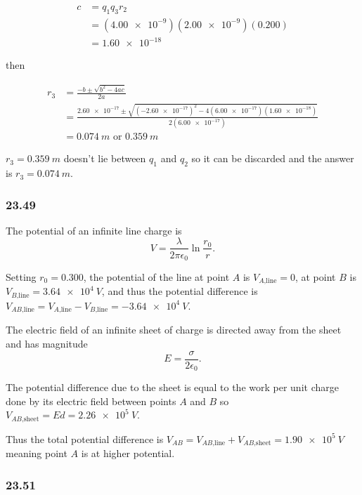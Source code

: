 \documentclass{article}
\begin{document}
\begin{enumerate}[a)]
        \begin{align*}
          c & = q_1 q_3 r_2                             \\
            & = (\num{4.00e-9}) (\num{2.00e-9}) (0.200) \\
            & = \num{1.60e-18}
        \end{align*}

        then

        \begin{align*}
          r_3 & = \frac{-b \pm \sqrt{b^2 - 4 a c}}{2 a}                                                                          \\
              & = \frac{\num{2.60e-17} \pm \sqrt{(\num{-2.60e-17})^2 - 4 (\num{6.00e-17}) (\num{1.60e-18})}}{2 (\num{6.00e-17})} \\
              & = \qty{0.074}{m} \textrm{ or } \qty{0.359}{m}
        \end{align*}

        $r_3 = \qty{0.359}{m}$ doesn't lie between $q_1$ and $q_2$ so it can be discarded and the answer is $r_3 = \qty{0.074}{m}$.
\end{enumerate}

\subsubsection{23.49}

The potential of an infinite line charge is \[V = \frac{\lambda}{2 \pi \epsilon_0} \ln \frac{r_0}{r}.\]

Setting $r_0 = 0.300$, the potential of the line at point $A$ is $V_{A\textrm{,line}} = 0$, at point $B$ is $V_{B\textrm{,line}} = \qty{3.64e4}{V}$, and thus the potential difference is $V_{AB\textrm{,line}} = V_{A\textrm{,line}} - V_{B\textrm{,line}} = \qty{-3.64e4}{V}$.

The electric field of an infinite sheet of charge is directed away from the sheet and has magnitude \[E = \frac{\sigma}{2 \epsilon_0}.\]

The potential difference due to the sheet is equal to the work per unit charge done by its electric field between points $A$ and $B$ so $V_{AB\textrm{,sheet}} = E d = \qty{2.26e5}{V}$.

Thus the total potential difference is $V_{AB} = V_{AB\textrm{,line}} + V_{AB\textrm{,sheet}} = \qty{1.90e5}{V}$ meaning point $A$ is at higher potential.

\subsubsection{23.51}
\end{document}
